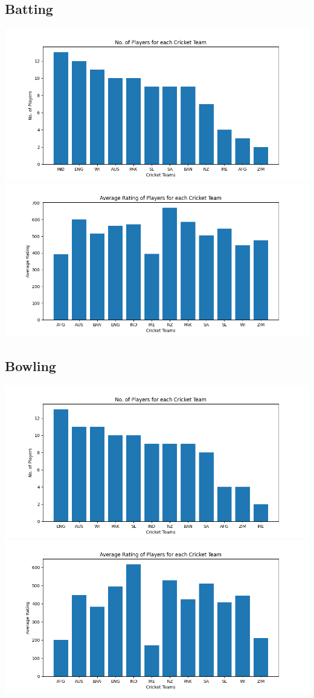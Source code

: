 \documentclass{article}
\begin{document}
\begin{normalsize}
            \subsection{Batting}\label{subsec:batting3}
                \includegraphics[scale=0.75]{test_batting_3-10-2023-1}
                \includegraphics[scale=0.75]{test_batting_3-10-2023-2}
            \subsection{Bowling}\label{subsec:bowling3}
                \includegraphics[scale=0.75]{test_bowling_3-10-2023-1}
                \includegraphics[scale=0.75]{test_bowling_3-10-2023-2}

\end{normalsize}
\end{document}
